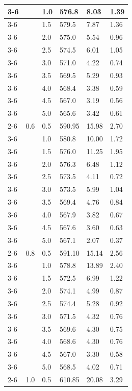 \begin{longtable}{|p{}|p{}|p{}|p{}|p{}|p{}|}
	\cline{3-6}
	& & 1.0 & 576.8 & 8.03 & 1.39 \\
	\cline{3-6}
	& & 1.5 & 579.5 & 7.87 & 1.36 \\
	\cline{3-6}
	& & 2.0 & 575.0 & 5.54 & 0.96 \\
	\cline{3-6}
	& & 2.5 & 574.5 & 6.01 & 1.05 \\
	\cline{3-6}
	& & 3.0 & 571.0 & 4.22 & 0.74 \\
	\cline{3-6}
	& & 3.5 & 569.5 & 5.29 & 0.93 \\
	\cline{3-6}
	& & 4.0 & 568.4 & 3.38 & 0.59 \\
	\cline{3-6}
	& & 4.5 & 567.0 & 3.19 & 0.56 \\
	\cline{3-6}
	& & 5.0 & 565.6 & 3.42 & 0.61 \\
	\cline{2-6}
	& 0.6 & 0.5 & 590.95 & 15.98 & 2.70 \\
	\cline{3-6}
	& & 1.0 & 580.8 & 10.00 & 1.72 \\
	\cline{3-6}
	& & 1.5 & 576.0 & 11.25 & 1.95 \\
	\cline{3-6}
	& & 2.0 & 576.3 & 6.48 & 1.12 \\
	\cline{3-6}
	& & 2.5 & 573.5 & 4.11 & 0.72 \\
	\cline{3-6}
	& & 3.0 & 573.5 & 5.99 & 1.04 \\
	\cline{3-6}
	& & 3.5 & 569.4 & 4.76 & 0.84 \\
	\cline{3-6}
	& & 4.0 & 567.9 & 3.82 & 0.67 \\
	\cline{3-6}
	& & 4.5 & 567.6 & 3.60 & 0.63 \\
	\cline{3-6}
	& & 5.0 & 567.1 & 2.07 & 0.37 \\
	\cline{2-6}
	& 0.8 & 0.5 & 591.10 & 15.14 & 2.56 \\
	\cline{3-6}
	& & 1.0 & 578.8 & 13.89 & 2.40 \\
	\cline{3-6}
	& & 1.5 & 572.5 & 6.99 & 1.22 \\
	\cline{3-6}
	& & 2.0 & 574.1 & 4.99 & 0.87 \\
	\cline{3-6}
	& & 2.5 & 574.4 & 5.28 & 0.92 \\
	\cline{3-6}
	& & 3.0 & 571.5 & 4.32 & 0.76 \\
	\cline{3-6}
	& & 3.5 & 569.6 & 4.30 & 0.75 \\
	\cline{3-6}
	& & 4.0 & 568.6 & 4.30 & 0.76 \\
	\cline{3-6}
	& & 4.5 & 567.0 & 3.30 & 0.58 \\
	\cline{3-6}
	& & 5.0 & 568.5 & 4.02 & 0.71 \\
	\cline{2-6}
	& 1.0 & 0.5 & 610.85 & 20.08 & 3.29 \\

\end{longtable}
